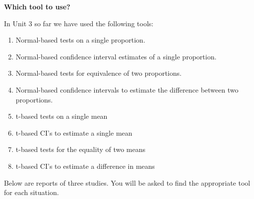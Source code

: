 \def\theTopic{Applying Unit 3 Tools }

\begin{center}
{\large\bf  Which tool to use?}
\\
\end{center}

In Unit 3 so far we have used the following tools:
\begin{enumerate}
\item Normal-based tests on a single proportion.
\item Normal-based confidence interval estimates of a single proportion.
\item Normal-based tests for equivalence of two proportions.
\item Normal-based confidence intervals to estimate the difference
  between two proportions.
\item t-based tests on a single mean
\item t-based CI's to estimate a single mean
\item t-based tests for the equality of two means
\item t-based CI's to estimate a difference in means
\end{enumerate}

Below are reports of three studies. You will be asked to find the
appropriate tool for each situation.

